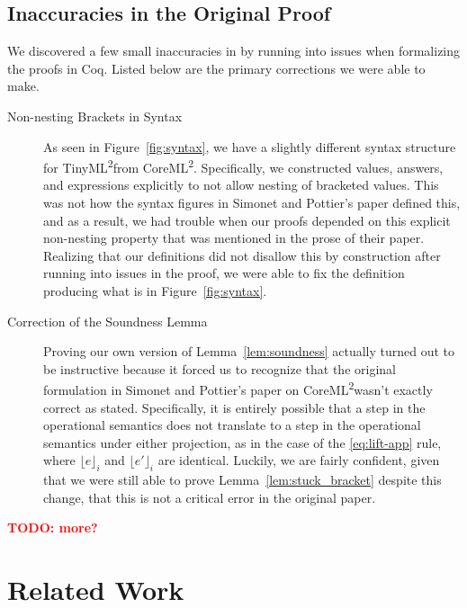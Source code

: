 \documentclass[a4paper,twocolumn]{article}
\newcommand{\langName}[0]{TinyML\textsuperscript{2}}
\newcommand{\origLang}[0]{CoreML\textsuperscript{2}}
\newcommand{\lift}[1]{\lfloor #1 \rfloor}
\newcommand{\todo}[1]{\textbf{\textcolor{red}{TODO: #1}}}
\theoremstyle{plain}
\theoremstyle{definition}
\begin{document}
\subsection{Inaccuracies in the Original Proof}

We discovered a few small inaccuracies in \cite{InfoFlowML} by running into
issues when formalizing the proofs in Coq.  Listed below are the primary
corrections we were able to make.

\begin{description}
  \item[Non-nesting Brackets in Syntax]
    \hspace{0pt}
    
    As seen in Figure~\ref{fig:syntax}, we have a slightly different syntax
    structure for \langName from \origLang.  Specifically, we constructed
    values, answers, and expressions explicitly to not allow nesting of
    bracketed values.  This was not how the syntax figures in Simonet and
    Pottier's paper defined this, and as a result, we had trouble when our
    proofs depended on this explicit non-nesting property that was mentioned in
    the prose of their paper.  Realizing that our definitions did not disallow
    this by construction after running into issues in the proof, we were able to
    fix the definition producing what is in Figure~\ref{fig:syntax}.
    
  \item[Correction of the Soundness Lemma]
    \hspace{0pt}

    Proving our own version of Lemma~\ref{lem:soundness} actually turned out to
    be instructive because it forced us to recognize that the original
    formulation in Simonet and Pottier's paper on \origLang wasn't exactly
    correct as stated.  Specifically, it is entirely possible that a step in the
    operational semantics does not translate to a step in the operational
    semantics under either projection, as in the case of the \ref{eq:lift-app}
    rule, where $\lift{e}_i$ and $\lift{e'}_i$ are identical.  Luckily, we are
    fairly confident, given that we were still able to prove
    Lemma~\ref{lem:stuck_bracket} despite this change, that this is not a
    critical error in the original paper.
\end{description}

\todo{more?}

\section{Related Work}
\label{sec:related}
\end{document}

